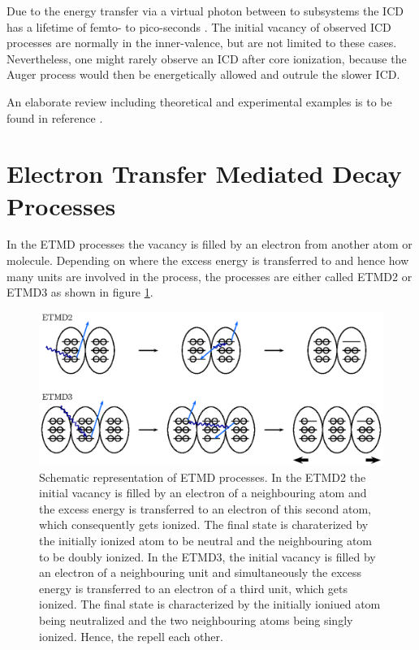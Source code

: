 
Due to the energy transfer via a virtual photon between to subsystems
the ICD has a lifetime of femto- to pico-seconds \cite{Zobeley98,Santra01_1,
Zobeley01,Santra01_3,Averbukh04,Averbukh05}.
The initial vacancy of observed ICD processes are normally in the inner-valence,
but are not limited to these cases. Nevertheless, one might rarely observe
an ICD after core ionization, because the Auger process would then be energetically
allowed and outrule the slower ICD.

An elaborate review including theoretical and experimental examples is to be
found in reference \cite{Hergenhahn11}.


\section{Electron Transfer Mediated Decay Processes}
In the \ac{ETMD} processes the vacancy is filled by an electron from another
atom or molecule. Depending on where
the excess energy is transferred to and
hence how many units are involved in the process, the processes are either called
ETMD2 or ETMD3 as shown in figure \ref{figure:etmd_processes}.

\begin{figure}[h]
 \centering
 \includegraphics{pics/etmd-pspic.eps}
 \caption{Schematic representation of \ac{ETMD} processes. In the ETMD2 the initial
          vacancy is filled by an electron of a neighbouring atom and the excess
          energy is transferred to an electron of this second atom, which
          consequently gets ionized. The final state is charaterized by the initially
          ionized atom to be neutral and the neighbouring atom to be doubly ionized.
          In the \ac{ETMD}3, the initial vacancy is filled by an electron of a
          neighbouring unit and simultaneously the excess energy is transferred to
          an electron of a third unit, which gets ionized. The final state is
          characterized by the initially ioniued atom being neutralized and the
          two neighbouring atoms being singly ionized. Hence, the repell each other.}
 \label{figure:etmd_processes}
\end{figure}


